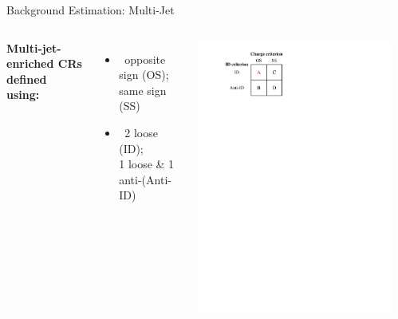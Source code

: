 \documentclass[11pt, xcolor={dvipsnames}, aspectratio=169, notes]{beamer}
\begin{document}

\begin{frame}{Background Estimation: Multi-Jet}
  \begin{columns}[onlytextwidth]

    \textbf{Multi-jet-enriched CRs defined using:}
    \begin{itemize}
      \setlength{\itemsep}{0.5em}

    \item {}\ opposite sign (OS); same sign (SS)

    \item {}\ 2 loose \tauhadvis (ID);\\1 loose
      \tauhadvis \& 1 anti-\tauhadvis (Anti-ID)

    \end{itemize}


    \vspace*{1em}

    \hfill\includegraphics[width=0.92\textwidth]{ff_sketch}


\end{columns}
\end{frame}
\end{document}
